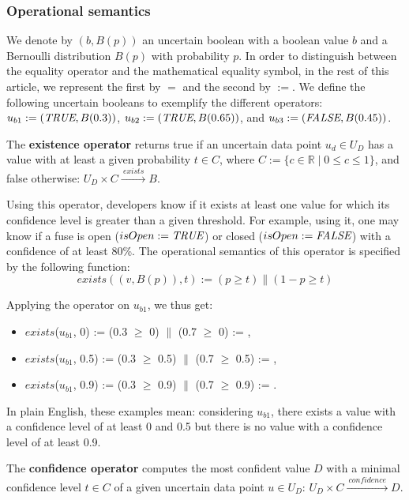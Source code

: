 \subsubsection{Operational semantics}
We denote by $(b, B(p))$ an uncertain boolean with a boolean value $b$ and a Bernoulli distribution $B(p)$ with probability $p$.
In order to distinguish between the equality operator and the mathematical equality symbol, in the rest of this article, we represent the first by $=$ and the second by $:=$.
We define the following uncertain booleans to exemplify the different operators: $u_{b1} := (\textit{TRUE}{}, B(0.3))$, $u_{b2} := (\textit{TRUE}{}, B(0.65))$, and $u_{b3} := (\textit{FALSE}{}, B(0.45))$.

\begin{operator}
	\label{op:existence}
	The \textbf{existence operator} returns true if an uncertain data point $u_d \in U_D$ has a value with at least a given probability $t \in C$, where $C := \{ c \in \mathds{R} \mid 0 \leqslant c \leqslant 1 \}$, and false otherwise:  $U_D \times C \xrightarrow{~exists~} B$.
\end{operator}

Using this operator, developers know if it exists at least one value for which its confidence level is greater than a given threshold. For example, using it, one may know if a fuse is open ($isOpen := \textit{TRUE}{}$) or closed ($isOpen := \textit{FALSE}{}$) with a confidence of at least 80\%.
The operational semantics of this operator is specified by the following function: \[exists((v, B(p)), t) := (p \geqslant t) \| (1-p \geqslant t)\]

Applying the operator on $u_{b1}$, we thus get:
\begin{itemize}
    \item $exists$($u_{b1}$, 0) := (0.3 $\geqslant$ 0) $\|$ (0.7 $\geqslant$ 0) := \true{},
    \item $exists$($u_{b1}$, 0.5) := (0.3 $\geqslant$ 0.5) $\|$ (0.7 $\geqslant$ 0.5) := \true{},
    \item $exists$($u_{b1}$, 0.9) := (0.3 $\geqslant$ 0.9) $\|$ (0.7 $\geqslant$ 0.9) := \false{}.
\end{itemize}
In plain English, these examples mean: considering $u_{b1}$, there exists a value with a confidence level of at least 0 and 0.5 but there is no value with a confidence level of at least  0.9.

\begin{operator}
	\label{op:confidence}
	The \textbf{confidence operator} computes the most confident value $D$ with a minimal confidence level $t \in C$ of a given uncertain data point $u \in U_D$: $U_D \times C \xrightarrow{~confidence~ }  D$.
\end{operator}

